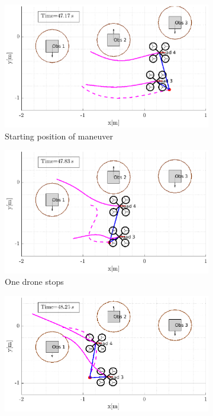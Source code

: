 \begin{figure}
	\centering
	\begin{subfigure}{0.45\textwidth}
		\centering
		\includegraphics[width=\textwidth]{Figures/zigzag/start}
		\caption{Starting position of maneuver}
		\label{subfig::zigzag::start}
	\end{subfigure}
	\begin{subfigure}{0.45\textwidth}
		\centering
		\includegraphics[width=\textwidth]{Figures/zigzag/stop}
		\caption{One drone stops}
		\label{subfig::zigzag::stop}
	\end{subfigure}
	\begin{subfigure}{0.45\textwidth}
		\centering
		\includegraphics[width=\textwidth]{Figures/zigzag/found}

\end{subfigure}
\end{figure}
